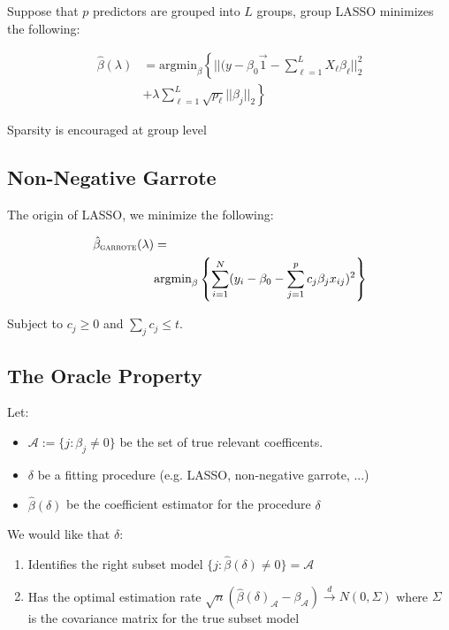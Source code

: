 \documentclass[twoside,twocolumn,10pt]{revtex4-1}
\begin{document}
	Suppose that $p$ predictors are grouped into $L$ groups, group LASSO minimizes the following:
	
	\begin{align*}
	\hat{\beta} (\lambda) &= \text{argmin}_\beta \left\lbrace || (y - \beta_0 \vec{1} - \sum_{\ell=1}^L X_\ell \beta_\ell ||_2^2 \right. \\ & \left.+ \lambda \sum_{\ell=1}^L \sqrt{p_\ell} ||\beta_j ||_2 \right\rbrace
	\end{align*}
	
	Sparsity is encouraged at group level
	
	\subsection{Non-Negative Garrote}
	
	The origin of LASSO, we minimize the following:
	
	\begin{align*}
	\hat{\beta}_\textsc{garrote} (\lambda) &= \\ &\text{argmin}_\beta \left\lbrace \sum_{i=1}^N (y_i - \beta_0 - \sum_{j=1}^p c_j \beta_j x_{ij} )^2 \right\rbrace
	\end{align*}
	
	Subject to $c_j \geq 0$ and $\sum_j c_j \leq t$.
	
	\subsection{The Oracle Property}
	
	Let:
	
	\begin{itemize}
	\item $\mathcal{A} := \lbrace j : \beta_j \neq 0 \rbrace$ be the set of true relevant coefficents. 
	\item $\delta$ be a fitting procedure (e.g. LASSO, non-negative garrote, ...)
	\item $\hat{\beta} (\delta)$ be the coefficient estimator for the procedure $\delta$
	\end{itemize}
	
	We would like that $\delta$:
	
	\begin{enumerate}
	\item Identifies the right subset model $\lbrace j : \hat{\beta} (\delta) \neq 0 \rbrace = \mathcal{A}$
	\item Has the optimal estimation rate $\sqrt{n} (\hat{\beta} (\delta)_\mathcal{A} - \beta_\mathcal{A}) \overset{d}{\to} N (0, \Sigma)$ where $\Sigma$ is the covariance matrix for the true subset model
	\end{enumerate}		
	
\end{document}

